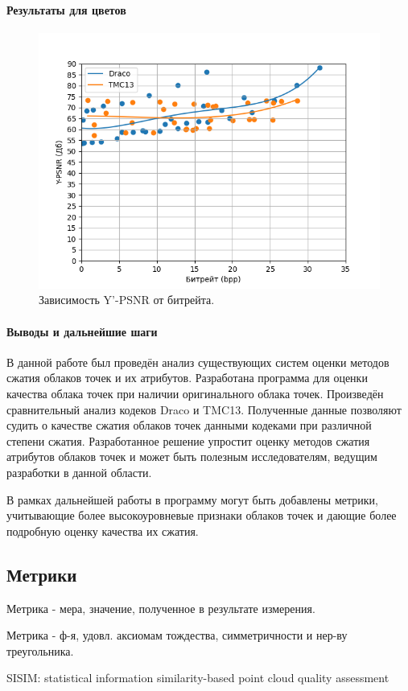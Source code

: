 \documentclass[a4paper,12pt]{extreport}
\begin{document}
\paragraph{Результаты для цветов}

\begin{figure}[H]
    \centering
    \includegraphics[width=0.49\linewidth]{assets/approx_y_psnr.png}
    \caption{ Зависимость Y'-PSNR от битрейта. }
    \label{img:pcc_arena_y_psnr}
\end{figure}

\paragraph{Выводы и дальнейшие шаги}

В данной работе был проведён анализ существующих систем оценки методов сжатия
облаков точек и их атрибутов. Разработана программа для оценки качества облака
точек при наличии оригинального облака точек. Произведён сравнительный анализ
кодеков Draco и TMC13. Полученные данные позволяют судить о качестве сжатия
облаков точек данными кодеками при различной степени сжатия. Разработанное
решение упростит оценку методов сжатия атрибутов облаков точек и может быть
полезным исследователям, ведущим разработки в данной области.

В рамках дальнейшей работы в программу могут быть добавлены метрики, учитывающие
более высокоуровневые признаки облаков точек и дающие более подробную оценку
качества их сжатия.

\subsection*{Метрики}

\noindent Метрика - мера, значение, полученное в результате измерения.

\noindent Метрика - ф-я, удовл. аксиомам тождества, симметричности и нер-ву
треугольника.

\noindent SISIM: statistical information similarity-based point cloud quality
assessment
\end{document}

